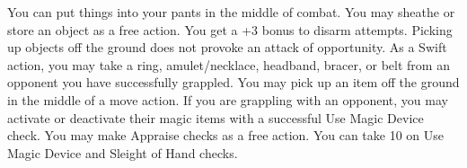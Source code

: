 {You can put things into your pants in the middle of combat.}
{You may sheathe or store an object as a free action.}
{You get a +3 bonus to disarm attempts. Picking up objects off the ground does not provoke an attack of opportunity.}
{As a Swift action, you may take a ring, amulet/necklace, headband, bracer, or belt from an opponent you have successfully grappled. You may pick up an item off the ground in the middle of a move action.}
{If you are grappling with an opponent, you may activate or deactivate their magic items with a successful Use Magic Device check. You may make Appraise checks as a free action.}
{You can take 10 on Use Magic Device and Sleight of Hand checks.}